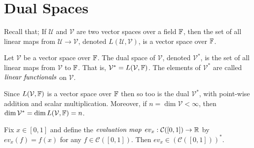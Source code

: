 \section{Dual Spaces} %
\label{sec:dualspace}

Recall that; If $\mathcal{U}$ and $\mathcal{V}$ are two
vector spaces over a field $\mathbb{F}$, then the set of all
linear maps from $\mathcal{U} \to \mathcal{V}$, denoted
$L(\mathcal{U},\mathcal{V})$, is a vector space over $\mathbb{F}$.

\begin{defn}
	Let $\mathcal{V}$ be a vector space over $\mathbb{F}$. The dual
	space of $\mathcal{V}$, denoted $\mathcal{V}^{*}$, is
	the set of all linear maps from $\mathcal{V}$ to $\mathbb{F}$.
	That is, $\mathcal{V}^{*} = L(\mathcal{V},\mathbb{F})$.
	The elements of $\mathcal{V}^{*}$ are called
	$\emph{linear functionals}$ on $\mathcal{V}$.
\end{defn}

\begin{rem}
	Since $L(\mathcal{V},\mathbb{F})$ is a vector space over $\mathbb{F}$ then
	so too is the dual $\mathcal{V}^{*}$, with point-wise addition and
	scalar multiplication. Moreover, if $n=\dim \mathcal{V} < \infty$,
	then $\dim \mathcal{V}^{*} = \dim L(\mathcal{V},\mathbb{F}) = n$.
\end{rem}

\begin{exmp}
	Fix $x \in [0,1]$ and define the $\emph{evaluation map}$
	$ev_x : \mathcal{C}([0,1]) \to \mathbb{R}$ by $ev_x (f) = f(x)$ for any
	$f \in \mathcal{C}([0,1])$.
	Then $ev_x \in \left( \mathcal{C}([0,1]) \right)^{*}$.
\end{exmp}
